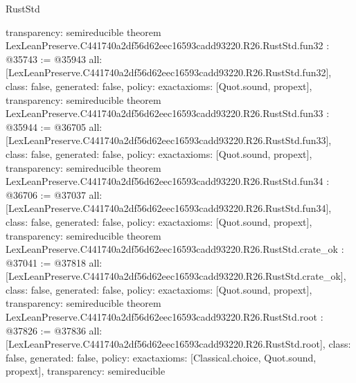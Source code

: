 \begin{lexlean}{RustStd}
\begin{coremodule}
{  transparency: semireducible
}
theorem LexLeanPreserve.C441740a2df56d62eec16593cadd93220.R26.RustStd.fun32 : @35743 := @35943 {
  all: [LexLeanPreserve.C441740a2df56d62eec16593cadd93220.R26.RustStd.fun32],
  class: false,
  generated: false,
  policy: exact{axioms: [Quot.sound, propext]},
  transparency: semireducible
}
theorem LexLeanPreserve.C441740a2df56d62eec16593cadd93220.R26.RustStd.fun33 : @35944 := @36705 {
  all: [LexLeanPreserve.C441740a2df56d62eec16593cadd93220.R26.RustStd.fun33],
  class: false,
  generated: false,
  policy: exact{axioms: [Quot.sound, propext]},
  transparency: semireducible
}
theorem LexLeanPreserve.C441740a2df56d62eec16593cadd93220.R26.RustStd.fun34 : @36706 := @37037 {
  all: [LexLeanPreserve.C441740a2df56d62eec16593cadd93220.R26.RustStd.fun34],
  class: false,
  generated: false,
  policy: exact{axioms: [Quot.sound, propext]},
  transparency: semireducible
}
theorem LexLeanPreserve.C441740a2df56d62eec16593cadd93220.R26.RustStd.crate_ok : @37041 := @37818 {
  all: [LexLeanPreserve.C441740a2df56d62eec16593cadd93220.R26.RustStd.crate_ok],
  class: false,
  generated: false,
  policy: exact{axioms: [Quot.sound, propext]},
  transparency: semireducible
}
theorem LexLeanPreserve.C441740a2df56d62eec16593cadd93220.R26.RustStd.root : @37826 := @37836 {
  all: [LexLeanPreserve.C441740a2df56d62eec16593cadd93220.R26.RustStd.root],
  class: false,
  generated: false,
  policy: exact{axioms: [Classical.choice, Quot.sound, propext]},
  transparency: semireducible
}


\end{coremodule}
\end{lexlean}
